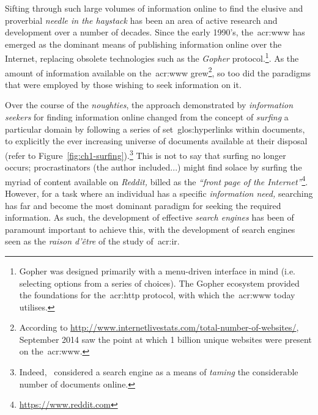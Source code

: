Sifting through such large volumes of information online to find the elusive and proverbial \emph{needle in the haystack} has been an area of active research and development over a number of decades. Since the early 1990's, the~\gls{acr:www} has emerged as the dominant means of publishing information online over the Internet, replacing obsolete technologies such as the \emph{Gopher} protocol.\footnote{Gopher was designed primarily with a menu-driven interface in mind (i.e. selecting options from a series of choices). The Gopher ecosystem provided the foundations for the~\gls{acr:http} protocol, with which the~\gls{acr:www} today utilises.}. As the amount of information available on the~\gls{acr:www} grew\footnote{According to \url{http://www.internetlivestats.com/total-number-of-websites/}, September 2014 saw the point at which 1 billion unique websites were present on the~\gls{acr:www}.}, so too did the paradigms that were employed by those wishing to seek information on it.

Over the course of the \emph{noughties}, the approach demonstrated by \emph{information seekers} for finding information online changed from the concept of \emph{surfing} a particular domain by following a series of set~\glspl{glos:hyperlink} within documents, to explicitly  the ever increasing universe of documents available at their disposal (refer to Figure~\ref{fig:ch1-surfing}).\footnote{Indeed,~\citep{mcbryan1994taming_tools} considered a search engine as a means of \emph{taming} the considerable number of documents online.} This is not to say that surfing no longer occurs; procrastinators (the author included...) might find solace by surfing the myriad of content available on \emph{Reddit,} billed as the \emph{``front page of the Internet''}\footnote{\url{https://www.reddit.com}}. However, for a task where an individual has a specific \emph{information need,} searching has far and become the most dominant paradigm for seeking the required information. As such, the development of effective \emph{search engines} has been of paramount important to achieve this, with the development of search engines seen as the \emph{raison d'\^{e}tre} of the study of~\gls{acr:ir}.

